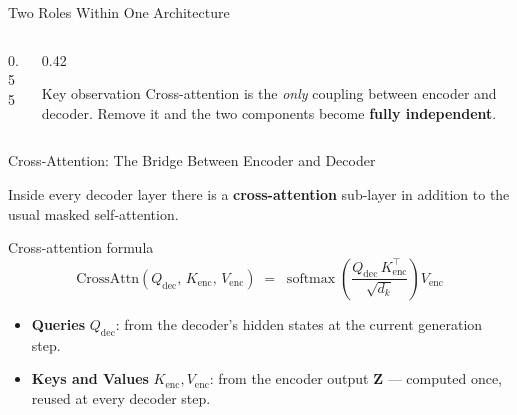 \documentclass[aspectratio=169]{beamer}
\begin{document}
\begin{frame}{Two Roles Within One Architecture}
\vspace{2mm}
\begin{columns}[c]
  \begin{column}{0.55\textwidth}
  \end{column}

  \begin{column}{0.42\textwidth}
    \begin{alertblock}{Key observation}
      \small Cross-attention is the \emph{only} coupling between
      encoder and decoder.  Remove it and the two components
      become \textbf{fully independent}.
    \end{alertblock}
  \end{column}
\end{columns}

\end{frame}
%
%
\begin{frame}{Cross-Attention: The Bridge Between Encoder and Decoder}

Inside every decoder layer there is a \textbf{cross-attention}
sub-layer in addition to the usual masked self-attention.

\medskip
\begin{block}{Cross-attention formula}
  \[
    \text{CrossAttn}(Q_{\mathrm{dec}},\, K_{\mathrm{enc}},\, V_{\mathrm{enc}})
    \;=\;
    \operatorname{softmax}\!\left(\frac{Q_{\mathrm{dec}}\,K_{\mathrm{enc}}^\top}
    {\sqrt{d_k}}\right) V_{\mathrm{enc}}
  \]
  \begin{itemize}
    \item \textbf{Queries} $Q_{\mathrm{dec}}$: from the decoder's hidden
          states at the current generation step.
    \item \textbf{Keys and Values} $K_{\mathrm{enc}}, V_{\mathrm{enc}}$:
          from the encoder output $\mathbf{Z}$ --- computed once,
          reused at every decoder step.
  \end{itemize}
\end{block}
\end{frame}
\end{document}
